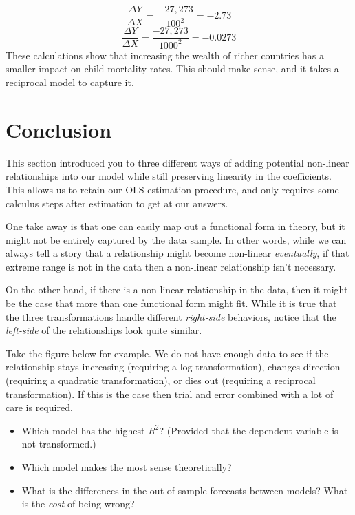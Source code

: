 \documentclass[
]{book}
\begin{document}
\[\frac{\Delta Y}{\Delta X} = \frac{-27,273} {100^{2}} = -2.73\]
\[\frac{\Delta Y}{\Delta X} = \frac{-27,273} {1000^{2}} = -0.0273\]
These calculations show that increasing the wealth of richer countries has a smaller impact on child mortality rates. This should make sense, and it takes a reciprocal model to capture it.

\section{Conclusion}\label{conclusion}

This section introduced you to three different ways of adding potential non-linear relationships into our model while still preserving linearity in the coefficients. This allows us to retain our OLS estimation procedure, and only requires some calculus steps after estimation to get at our answers.

One take away is that one can easily map out a functional form in theory, but it might not be entirely captured by the data sample. In other words, while we can always tell a story that a relationship might become non-linear \emph{eventually}, if that extreme range is not in the data then a non-linear relationship isn't necessary.

On the other hand, if there is a non-linear relationship in the data, then it might be the case that more than one functional form might fit. While it is true that the three transformations handle different \emph{right-side} behaviors, notice that the \emph{left-side} of the relationships look quite similar.

Take the figure below for example. We do not have enough data to see if the relationship stays increasing (requiring a log transformation), changes direction (requiring a quadratic transformation), or dies out (requiring a reciprocal transformation). If this is the case then trial and error combined with a lot of care is required.

\begin{itemize}
\item
  Which model has the highest \(R^2\)? (Provided that the dependent variable is not transformed.)
\item
  Which model makes the most sense theoretically?
\item
  What is the differences in the out-of-sample forecasts between models? What is the \emph{cost} of being wrong?
\end{itemize}
\end{document}
